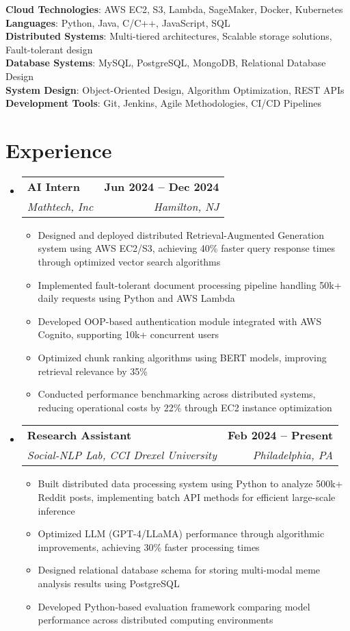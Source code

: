 \documentclass[letterpaper,11pt]{article}
\makeatletter
\newcommand{\resumeItem}[1]{
  \item\small{
    {#1 \vspace{-2pt}}
  }
}
\newcommand{\resumeSubheading}[4]{
  \vspace{-2pt}\item
    \begin{tabular*}{1.0\textwidth}[t]{l@{\extracolsep{\fill}}r}
      \textbf{#1} & \textbf{\small #2} \\
      \textit{\small#3} & \textit{\small #4} \\
    \end{tabular*}\vspace{-7pt}
}
\newcommand{\resumeSubHeadingListStart}{\begin{itemize}[leftmargin=0.0in, label={}]}
\newcommand{\resumeSubHeadingListEnd}{\end{itemize}}
\newcommand{\resumeItemListStart}{\begin{itemize}}
\newcommand{\resumeItemListEnd}{\end{itemize}\vspace{-5pt}}
\makeatother
\begin{document}
\begin{itemize}[leftmargin=0.15in, label={}]
	\small{\item{
		\textbf{Cloud Technologies}{: AWS EC2, S3, Lambda, SageMaker, Docker, Kubernetes} \\
		\textbf{Languages}{: Python, Java, C/C++, JavaScript, SQL} \\
		\textbf{Distributed Systems}{: Multi-tiered architectures, Scalable storage solutions, Fault-tolerant design} \\
		\textbf{Database Systems}{: MySQL, PostgreSQL, MongoDB, Relational Database Design} \\
		\textbf{System Design}{: Object-Oriented Design, Algorithm Optimization, REST APIs} \\
		\textbf{Development Tools}{: Git, Jenkins, Agile Methodologies, CI/CD Pipelines}}
	}
\end{itemize}
\vspace{-15pt}

\section{Experience}
  \resumeSubHeadingListStart
    \resumeSubheading
    {AI Intern}{Jun 2024 -- Dec 2024}
    {Mathtech, Inc}{Hamilton, NJ}
    \resumeItemListStart
        \resumeItem{Designed and deployed distributed Retrieval-Augmented Generation system using AWS EC2/S3, achieving 40\% faster query response times through optimized vector search algorithms}
        \resumeItem{Implemented fault-tolerant document processing pipeline handling 50k+ daily requests using Python and AWS Lambda}
        \resumeItem{Developed OOP-based authentication module integrated with AWS Cognito, supporting 10k+ concurrent users}
        \resumeItem{Optimized chunk ranking algorithms using BERT models, improving retrieval relevance by 35\%}
        \resumeItem{Conducted performance benchmarking across distributed systems, reducing operational costs by 22\% through EC2 instance optimization}
    \resumeItemListEnd
    \resumeSubheading
    {Research Assistant}{Feb 2024 -- Present}
    {Social-NLP Lab, CCI Drexel University}{Philadelphia, PA}
    \resumeItemListStart
        \resumeItem{Built distributed data processing system using Python to analyze 500k+ Reddit posts, implementing batch API methods for efficient large-scale inference}
        \resumeItem{Optimized LLM (GPT-4/LLaMA) performance through algorithmic improvements, achieving 30\% faster processing times}
        \resumeItem{Designed relational database schema for storing multi-modal meme analysis results using PostgreSQL}
        \resumeItem{Developed Python-based evaluation framework comparing model performance across distributed computing environments}
    \resumeItemListEnd
\resumeSubHeadingListEnd
\vspace{-15pt}
\end{document}
